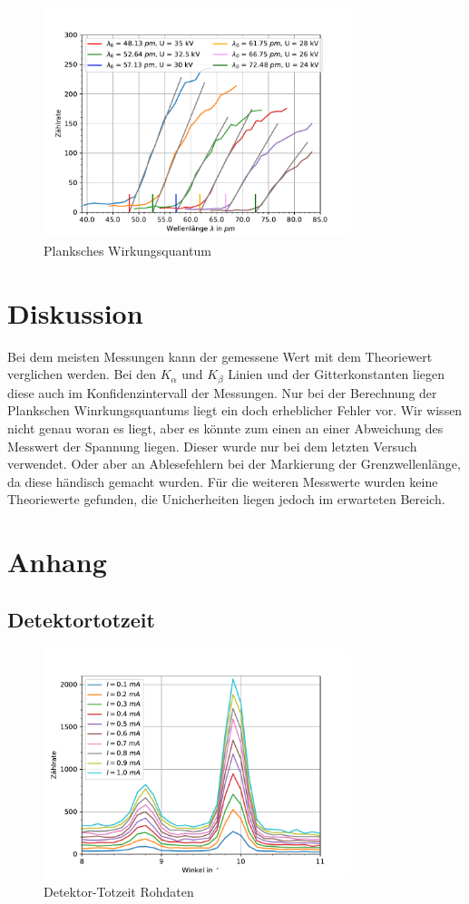 \documentclass[11pt, a4paper]{article}
\begin{document}
    \begin{figure}
        \centering
        \includegraphics[width=0.8\textwidth]{Plank.pdf}
        \caption{Planksches Wirkungsquantum}
        \label{fig:plank}
    \end{figure}

    \section{Diskussion}

    Bei dem meisten Messungen kann der gemessene Wert mit dem Theoriewert verglichen werden. Bei den $K_{\alpha}$ und $K_{\beta}$ Linien und der Gitterkonstanten liegen diese auch im Konfidenzintervall der Messungen. Nur bei der Berechnung der Plankschen Winrkungsquantums liegt ein doch erheblicher Fehler vor. Wir wissen nicht genau woran es liegt, aber es könnte zum einen an einer Abweichung des Messwert der Spannung liegen. Dieser wurde nur bei dem letzten Versuch verwendet. Oder aber an Ablesefehlern bei der Markierung der Grenzwellenlänge, da diese händisch gemacht wurden. Für die weiteren Messwerte wurden keine Theoriewerte gefunden, die Unicherheiten liegen jedoch im erwarteten Bereich.

    \section{Anhang}

    \subsection{Detektortotzeit}

    \begin{figure}
        \centering
        \includegraphics[width=0.8\textwidth]{DetektortotzeitRoh.pdf}
        \caption{Detektor-Totzeit Rohdaten}
        \label{fig:totzeitroh}
    \end{figure}


    
    
\end{document}
